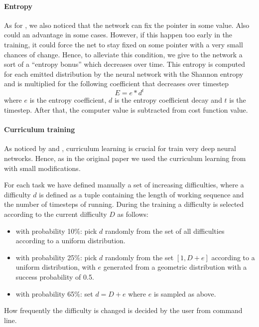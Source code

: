\paragraph{Entropy}
As for \cite{NRAM:2016}, we also noticed that the network can fix the pointer in some value. Also  could an advantage in some cases. However, if this happen too early in the training, it could force the net to stay fixed on some pointer with a very small chances of change. Hence, to alleviate this condition, we give to the network a sort of a ``entropy bonus'' which decreases over time. This entropy is computed for each emitted distribution by the neural network with the Shannon entropy and is multiplied for the following coefficient that decreases over timestep
\begin{equation}
	E = e * d^{t}
\end{equation}
where $e$ is the entropy coefficient, $d$ is the entropy coefficient decay and $t$ is the timestep. After that, the computer value is subtracted from cost function value.

\paragraph{Curriculum training}
As noticed by \cite{Bengio2009CurriculumL} and \cite{Zaremba2014LearningTE}, curriculum learning is crucial for train very deep neural networks. Hence, as in the original paper we used the curriculum learning from \cite{Zaremba2014LearningTE} with small modifications.

For each task we have defined manually a set of increasing difficulties, where a difficulty $d$ is defined as a tuple containing the length of working sequence and the number of timesteps of running. During the training a difficulty is selected according to the current difficulty $D$ as follows:
\begin{itemize}
	\item{with probability 10\%: pick $d$ randomly from the set of all difficulties according to a uniform distribution.}
	\item{with probability 25\%: pick $d$ randomly from the set $[1, D + e]$ according to a uniform distribution, with $e$ generated from a geometric distribution with a success probability of 0.5.}
	\item{with probability 65\%: set $d = D + e$ where $e$ is sampled as above.}
\end{itemize}
How frequently the difficulty is changed is decided by the user from command line.

